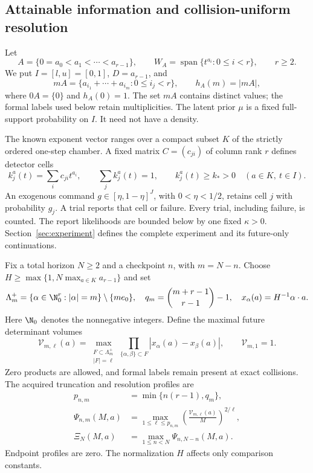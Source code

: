 
\subsection{Attainable information and collision-uniform resolution}
Let
\[
 A=\{0=a_0<a_1<\cdots<a_{r-1}\},\qquad
 W_A=\operatorname{span}\{t^{a_i}:0\le i<r\},\qquad r\ge2.
\]
We put $I=[l,u]=[0,1]$, $D=a_{r-1}$, and
\[
 mA=\{a_{i_1}+\cdots+a_{i_m}:0\le i_j<r\},\qquad
 h_A(m)=|mA|,
\]
where $0A=\{0\}$ and $h_A(0)=1$. The set $mA$ contains distinct
values; the formal labels used below retain multiplicities. The latent
prior $\mu$ is a fixed full-support probability on $I$. It need not
have a density.

The known exponent vector ranges over a compact subset $K$ of the
strictly ordered one-step chamber. A fixed matrix $C=(c_{ji})$ of
column rank $r$ defines detector cells
\[
 k_j^a(t)=\sum_i c_{ji}t^{a_i},\qquad
 \sum_j k_j^a(t)=1,\qquad k_j^a(t)\ge k_*>0
                  \quad(a\in K,\ t\in I).
\]
An exogenous command $g\in[\eta,1-\eta]^J$, with $0<\eta<1/2$,
retains cell $j$ with probability $g_j$. A trial reports that cell or
failure. Every trial, including failure, is counted. The report
likelihoods are bounded below by one fixed $\kappa>0$.
Section~\ref{sec:experiment}
defines the complete experiment and its future-only continuations.

Fix a total horizon $N\ge2$ and a checkpoint $n$, with $m=N-n$.
Choose $H\ge\max\{1,N\max_{a\in K}a_{r-1}\}$ and set
\[
 \Lambda_m^+=\{\alpha\in\N_0^r:|\alpha|=m\}\setminus\{me_0\},
 \quad q_m=\binom{m+r-1}{r-1}-1,
 \quad x_\alpha(a)=H^{-1}\alpha\cdot a.
\]
Here $\N_0$ denotes the nonnegative integers. Define the maximal
future determinant volumes
\[
 \mathcal V_{m,\ell}(a)=
 \max_{\substack{F\subset\Lambda_m^+\\|F|=\ell}}
       \prod_{\{\alpha,\beta\}\subset F}
                      |x_\alpha(a)-x_\beta(a)|,
                      \qquad \mathcal V_{m,1}=1.
\]
Zero products are allowed, and formal labels remain present at exact
collisions. The acquired truncation and resolution profiles are
\[
 \begin{split}
 p_{n,m}&=\min\{n(r-1),q_m\},\\
 \Psi_{n,m}(M,a)&=
   \max_{1\le\ell\le p_{n,m}}
       \left(\frac{\mathcal V_{m,\ell}(a)}{M}\right)^{2/\ell},\\
 \Xi_N(M,a)&=\max_{1\le n<N}\Psi_{n,N-n}(M,a).
 \end{split}
\]
Endpoint profiles are zero. The normalization $H$ affects only
comparison constants.

